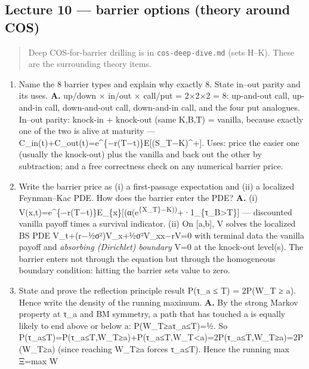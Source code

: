 \documentclass[
  11pt,
]{article}
\providecommand{\tightlist}{%
  \setlength{\itemsep}{0pt}\setlength{\parskip}{0pt}}
\begin{document}
\hypertarget{lecture-10-barrier-options-theory-around-cos}{%
\subsection{Lecture 10 --- barrier options (theory around
COS)}\label{lecture-10-barrier-options-theory-around-cos}}

\begin{quote}
Deep COS-for-barrier drilling is in \texttt{cos-deep-dive.md} (sets
H--K). These are the surrounding theory items.
\end{quote}

\begin{enumerate}
\def\labelenumi{\arabic{enumi}.}
\setcounter{enumi}{9}
\tightlist
\item
  Name the 8 barrier types and explain why exactly 8. State in--out
  parity and its uses. \textbf{A.} up/down × in/out × call/put = 2×2×2 =
  8: up-and-out call, up-and-in call, down-and-out call, down-and-in
  call, and the four put analogues. In--out parity: knock-in + knock-out
  (same K,B,T) = vanilla, because exactly one of the two is alive at
  maturity --- C\_in(t)+C\_out(t)=e\^{}\{−r(T−t)\}E{[}(S\_T−K)\^{}+{]}.
  Uses: price the easier one (usually the knock-out) plus the vanilla
  and back out the other by subtraction; and a free correctness check on
  any numerical barrier price.
\item
  Write the barrier price as (i) a first-passage expectation and (ii) a
  localized Feynman--Kac PDE. How does the barrier enter the PDE?
  \textbf{A.} (i)
  V(x,t)=e\^{}\{−r(T−t)\}E\_\{x\}{[}(α(e\textsuperscript{\{X\_T\}−K))}+·1\_\{τ\_B\textgreater T\}{]}
  --- discounted vanilla payoff times a survival indicator. (ii) On
  {[}a,b{]}, V solves the localized BS PDE
  V\_t+(r−½σ²)V\_x+½σ²V\_xx−rV=0 with terminal data the vanilla payoff
  and \emph{absorbing (Dirichlet) boundary} V=0 at the knock-out
  level(s). The barrier enters not through the equation but through the
  homogeneous boundary condition: hitting the barrier sets value to
  zero.
\item
  State and prove the reflection principle result P(τ\_a ≤ T) = 2P(W\_T
  ≥ a). Hence write the density of the running maximum. \textbf{A.} By
  the strong Markov property at τ\_a and BM symmetry, a path that has
  touched a is equally likely to end above or below a:
  P(W\_T≥a\textbar τ\_a≤T)=½. So
  P(τ\_a≤T)=P(τ\_a≤T,W\_T≥a)+P(τ\_a≤T,W\_T\textless a)=2P(τ\_a≤T,W\_T≥a)=2P(W\_T≥a)
  (since reaching W\_T≥a forces τ\_a≤T). Hence the running max Ξ=max W

\end{enumerate}
\end{document}
